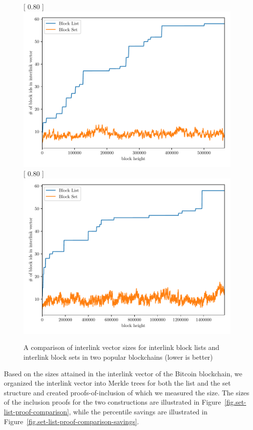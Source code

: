 \begin{figure}
   \centering
   [
       0.80\textwidth
   ]
   {
       \includegraphics[width=0.85 \textwidth]
       {figures/interlink-vector-blocklist-vs-blockset.pdf}
   }
   \vskip 0pt
   [
       0.80\textwidth
   ]
   {
       \includegraphics[width=0.85 \textwidth]
       {figures/interlink-vector-blocklist-vs-blockset-litecoin.pdf}
   }
   \caption{A comparison of interlink vector sizes for interlink block lists and interlink block sets in two popular blockchains (lower is better)}
   \label{fig.set-list-vector-comparison}
\end{figure}

Based on the sizes attained in the interlink vector of the Bitcoin blockchain,
we organized the interlink vector into Merkle trees for both the list and the
set structure and created proofs-of-inclusion of which we measured the size. The
sizes of the inclusion proofs for the two constructions are illustrated in
Figure~\ref{fig.set-list-proof-comparison}, while the percentile savings are
illustrated in Figure~\ref{fig.set-list-proof-comparison-savings}.

